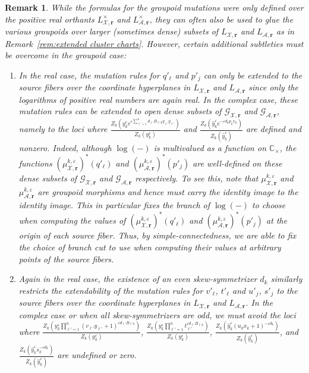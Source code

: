 \documentclass{amsart}
\newtheorem{remark}[theorem]{Remark}
\numberwithin{equation}{section}
\newcommand{\bfr}{{\boldsymbol{r}}}
\newcommand{\cA}{\mathcal{A}}
\newcommand{\cG}{\mathcal{G}}
\newcommand{\cX}{\mathcal{X}}
\newcommand{\CC}{\mathbb{C}}
\begin{document}
\begin{remark}
  \label{rem:extended groupoid charts}
  While the formulas for the groupoid mutations were only defined over the positive real orthants $L^\times_{\cX,\bfr}$ and $L^\times_{\cA,\bfr}$, they can often also be used to glue the various groupoids over larger (sometimes dense) subsets of $L_{\cX,\bfr}$ and $L_{\cA,\bfr}$ as in Remark~\ref{rem:extended cluster charts}.
  However, certain additional subtleties must be overcome in the groupoid case:
  \begin{enumerate}
    \item In the real case, the mutation rules for $q'_\ell$ and $p'_j$ can only be extended to the source fibers over the coordinate hyperplanes in $L_{\cX,\bfr}$ and $L_{\cA,\bfr}$ since only the logarithms of positive real numbers are again real.
      In the complex case, these mutation rules can be extended to open dense subsets of $\cG_{\cX,\bfr}$ and $\cG_{\cA,\bfr}$, namely to the loci where $\frac{Z_k\left(y_k^\varepsilon e^{\varepsilon\sum_{\ell'=1}^n d_{\ell'} B_{\ell' k}q_{\ell'} y_{\ell'}}\right)}{Z_k(y_k^\varepsilon)}$ and $\frac{Z_k\left(\hat y_k^\varepsilon e^{-\varepsilon d_kp_kx_k}\right)}{Z_k(\hat y_k^\varepsilon)}$ are defined and nonzero.
      Indeed, although $\log(-)$ is multivalued as a function on $\CC_\times$, the functions $(\mu_{\cX,\bfr}^{k,\varepsilon})^*(q'_\ell)$ and $(\mu_{\cA,\bfr}^{k,\varepsilon})^*(p'_j)$ are well-defined on these dense subsets of $\cG_{\cX,\bfr}$ and $\cG_{\cA,\bfr}$ respectively.
      To see this, note that $\mu_{\cX,\bfr}^{k,\varepsilon}$ and $\mu_{\cA,\bfr}^{k,\varepsilon}$ are groupoid morphisms and hence must carry the identity image to the identity image.
      This in particular fixes the branch of $\log(-)$ to choose when computing the values of $(\mu_{\cX,\bfr}^{k,\varepsilon})^*(q'_\ell)$ and $(\mu_{\cA,\bfr}^{k,\varepsilon})^*(p'_j)$ at the origin of each source fiber.
      Thus, by simple-connectedness, we are able to fix the choice of branch cut to use when computing their values at arbitrary points of the source fibers. 
    \item Again in the real case, the existence of an even skew-symmetrizer $d_k$ similarly restricts the extendability of the mutation rules for $v'_\ell$, $t'_\ell$ and $u'_j$, $s'_j$ to the source fibers over the coordinate hyperplanes in $L_{\cX,\bfr}$ and $L_{\cA,\bfr}$.
      In the complex case or when all skew-symmetrizers are odd, we must avoid the loci where $\frac{Z_k\left(y_k^\varepsilon \prod_{\ell'=1}^n (v_{\ell'} y_{\ell'} + 1)^{\varepsilon d_{\ell'} B_{\ell' k}}\right)}{Z_k(y_k^\varepsilon)}$, $\frac{Z_k\left(y_k^\varepsilon \prod_{\ell'=1}^n t_{\ell'}^{\varepsilon d_{\ell'} B_{\ell' k}}\right)}{Z_k(y_k^\varepsilon)}$, $\frac{Z_k\left(\hat y_k^\varepsilon (u_k x_k +1)^{-\varepsilon d_k}\right)}{Z_k(\hat y_k^\varepsilon)}$, and $\frac{Z_k\left(\hat y_k^\varepsilon s_k^{-\varepsilon d_k}\right)}{Z_k(\hat y_k^\varepsilon)}$ are undefined or zero.

\end{enumerate}
\end{remark}
\end{document}
